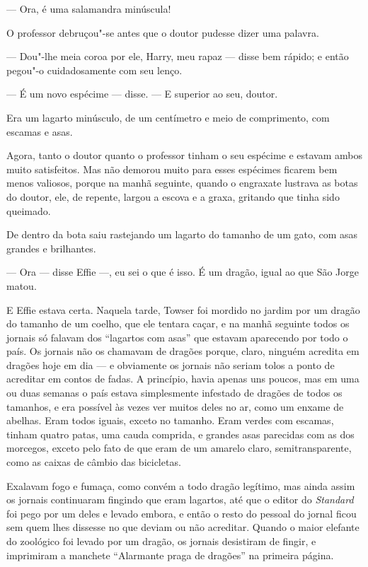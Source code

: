 --- Ora, é uma salamandra minúscula!

O professor debruçou"-se antes que o doutor pudesse dizer uma palavra.

--- Dou"-lhe meia coroa por ele, Harry, meu rapaz --- disse bem rápido; e		%
então pegou"-o cuidadosamente com seu lenço.

--- É um novo espécime --- disse. --- E superior ao seu, doutor.

Era um lagarto minúsculo, de um centímetro e meio de comprimento, com
escamas e asas.

Agora, tanto o doutor quanto o professor tinham o seu
espécime e estavam ambos muito satisfeitos. Mas não demorou muito
para esses espécimes ficarem bem menos valiosos, porque na manhã
seguinte, quando o engraxate lustrava as botas do doutor, ele, de
repente, largou a escova e a graxa, gritando que tinha sido queimado.

De dentro da bota saiu rastejando um lagarto do tamanho de um gato,
com asas grandes e brilhantes.

--- Ora --- disse Effie ---, eu sei o que é isso. É um dragão, igual ao que
São Jorge matou.

E Effie estava certa. Naquela tarde, Towser foi mordido no jardim por
um dragão do tamanho de um coelho, que ele tentara caçar, e na manhã
seguinte todos os jornais só falavam dos “lagartos com asas” que
estavam aparecendo por todo o país. Os jornais não os chamavam de
dragões porque, claro, ninguém acredita em dragões hoje em dia --- e
obviamente os jornais não seriam tolos a ponto de acreditar em contos
de fadas. A princípio, havia apenas uns poucos, mas em uma ou duas
semanas o país estava simplesmente infestado de dragões de todos os
tamanhos, e era possível às vezes ver muitos deles no ar, como um
enxame de abelhas. Eram todos iguais, exceto no tamanho. Eram verdes
com escamas, tinham quatro patas, uma cauda comprida, e grandes asas
parecidas com as dos morcegos, exceto pelo fato de que eram de um
amarelo claro, semitransparente, como as caixas de câmbio das
bicicletas.

Exalavam fogo e fumaça, como convém a todo dragão legítimo, mas ainda
assim os jornais continuaram fingindo que eram lagartos, até que o
editor do \textit{Standard} foi pego por um deles e levado embora, e então o
resto do pessoal do jornal ficou sem quem lhes dissesse no que deviam
ou não acreditar. Quando o maior elefante do zoológico
foi levado por um dragão, os jornais desistiram de fingir,
e imprimiram a manchete “Alarmante praga de dragões” na primeira
página.

